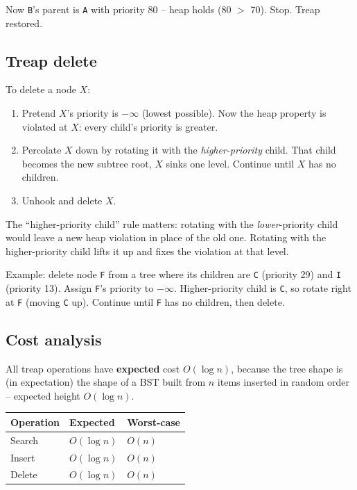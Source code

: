 \documentclass[11pt]{article}
\begin{document}
Now \texttt{B}'s parent is \texttt{A} with priority 80 -- heap holds (80 $>$ 70). Stop. Treap restored.

\subsection*{Treap delete}

To delete a node $X$:
\begin{enumerate}[leftmargin=*]
    \item Pretend $X$'s priority is $-\infty$ (lowest possible). Now the heap property is violated at $X$: every child's priority is greater.
    \item Percolate $X$ down by rotating it with the \emph{higher-priority} child. That child becomes the new subtree root, $X$ sinks one level. Continue until $X$ has no children.
    \item Unhook and delete $X$.
\end{enumerate}

The ``higher-priority child'' rule matters: rotating with the \emph{lower}-priority child would leave a new heap violation in place of the old one. Rotating with the higher-priority child lifts it up and fixes the violation at that level.

Example: delete node \texttt{F} from a tree where its children are \texttt{C} (priority 29) and \texttt{I} (priority 13). Assign \texttt{F}'s priority to $-\infty$. Higher-priority child is \texttt{C}, so rotate right at \texttt{F} (moving \texttt{C} up). Continue until \texttt{F} has no children, then delete.

\subsection*{Cost analysis}

All treap operations have \textbf{expected} cost $O(\log n)$, because the tree shape is (in expectation) the shape of a BST built from $n$ items inserted in random order -- expected height $O(\log n)$.

\begin{center}
\begin{tabular}{lll}
Operation & Expected & Worst-case \\
\hline
Search & $O(\log n)$ & $O(n)$ \\
Insert & $O(\log n)$ & $O(n)$ \\
Delete & $O(\log n)$ & $O(n)$ \\
\end{tabular}
\end{center}
\end{document}
